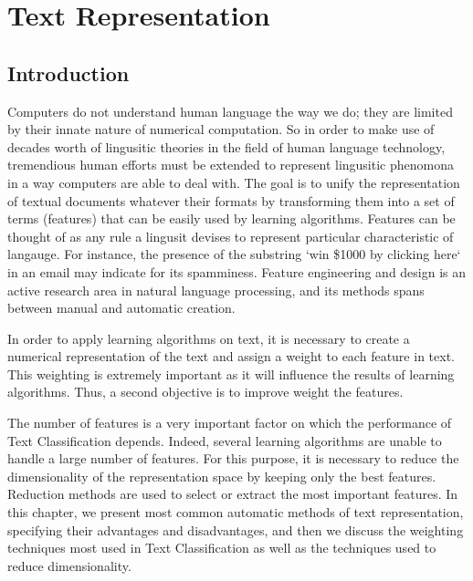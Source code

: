 
\chapter{Text Representation} %

\label{Chapter1} %


\section{Introduction} 

Computers do not understand human language the way we do; they are limited by their innate nature of numerical computation. So in order to make use of decades worth of lingusitic theories in the field of human language technology, tremendious human efforts must be extended to represent lingusitic phenomona in a way computers are able to deal with. The goal is to unify the representation of textual documents
whatever their formats by transforming them into a set of terms
(features) that can be easily used by learning algorithms. Features can be thought of as any rule a lingusit devises to represent particular characteristic of langauge. For instance, the presence of the substring `win \$1000 by clicking here` in an email may indicate for its spamminess. Feature engineering and design is an active research area in natural language processing, and its methods spans between manual and automatic creation.

In order to apply learning algorithms on text, it is necessary to create
a numerical representation of the text and assign a weight to each
feature in text. This weighting is extremely important as it will
influence the results of learning algorithms. Thus, a second objective
is to improve weight the features.

The number of features is a very important factor on which the
performance of Text Classification depends. Indeed, several learning
algorithms are unable to handle a large number of features. For this
purpose, it is necessary to reduce the dimensionality of the
representation space by keeping only the best features. Reduction
methods are used to select or extract the most important features. In
this chapter, we present most common automatic methods of text
representation, specifying their advantages and disadvantages, and then we
discuss the weighting techniques most used in Text Classification as
well as the techniques used to reduce dimensionality.

